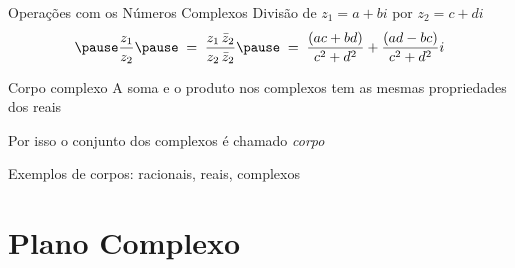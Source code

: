 \documentclass[fleqn,utf8,aspectratio=169,12pt,ignorenonframetext]{beamer}
\begin{document}
\begin{frame}{Operações com os Números Complexos}
  Divisão de \(z_1=a+bi\) por \(z_2=c+di\)
  \[
    \pause
    \frac{z_1}{z_2}
    \pause
    \;=\; \frac{z_1\,\bar{z}_2}{z_2\,\bar{z}_2}
    \pause
    \;=\; \frac{(ac + bd)}{c^2 + d^2} + \frac{(ad -bc)}{c^2 + d^2}i
  \]
\end{frame}

\begin{frame}{Corpo complexo}
  A soma e o produto nos complexos tem as mesmas propriedades dos reais

  \vspace{\baselineskip}
  Por isso o conjunto dos complexos é chamado \emph{corpo}

  \vspace{\baselineskip}
  Exemplos de corpos: racionais, reais, complexos
\end{frame}



\section{Plano Complexo}
\end{document}
